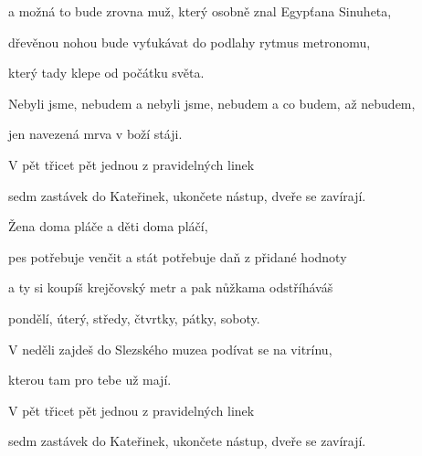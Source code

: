a možná to bude zrovna muž, který osobně znal Egypťana Sinuheta,

dřevěnou nohou bude vyťukávat do podlahy rytmus metronomu,

který tady klepe od počátku světa.

Nebyli jsme, nebudem a nebyli jsme, nebudem a co budem, až nebudem,

jen navezená mrva v boží stáji.

V pět třicet pět jednou z pravidelných linek

sedm zastávek do Kateřinek, ukončete nástup, dveře se zavírají.
\ks

\zs
Žena doma pláče a děti doma pláčí,

pes potřebuje venčit a stát potřebuje daň z přidané hodnoty

a ty si koupíš krejčovský metr a pak nůžkama odstříháváš

pondělí, úterý, středy, čtvrtky, pátky, soboty.

V neděli zajdeš do Slezského muzea podívat se na vitrínu,

kterou tam pro tebe už mají.

V pět třicet pět jednou z pravidelných linek

sedm zastávek do Kateřinek, ukončete nástup, dveře se zavírají.
\ks

\kp
